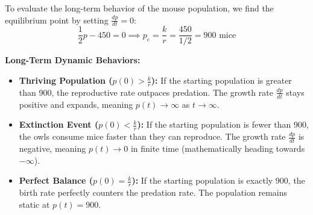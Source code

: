 \documentclass[11pt]{article}
\begin{document}
To evaluate the long-term behavior of the mouse population, we find the equilibrium point by setting $\frac{dp}{dt} = 0$:
\[
  \frac{1}{2}p - 450 = 0 \implies p_e = \frac{k}{r} = \frac{450}{1/2} = 900 \text{ mice}
\]

\textbf{Long-Term Dynamic Behaviors:}
\begin{itemize}
    \item \textbf{Thriving Population ($p(0) > \frac{k}{r}$):} If the starting population is greater than 900, the reproductive rate outpaces predation. The growth rate $\frac{dp}{dt}$ stays positive and expands, meaning $p(t) \to \infty$ as $t \to \infty$.
    \item \textbf{Extinction Event ($p(0) < \frac{k}{r}$):} If the starting population is fewer than 900, the owls consume mice faster than they can reproduce. The growth rate $\frac{dp}{dt}$ is negative, meaning $p(t) \to 0$ in finite time (mathematically heading towards $-\infty$).
    \item \textbf{Perfect Balance ($p(0) = \frac{k}{r}$):} If the starting population is exactly 900, the birth rate perfectly counters the predation rate. The population remains static at $p(t) = 900$.
\end{itemize}
\end{document}
